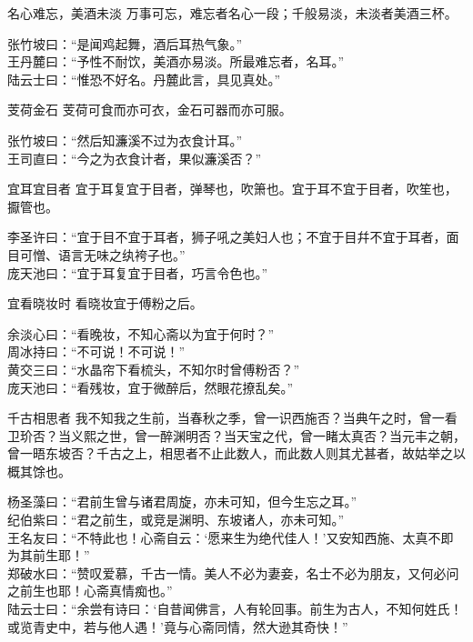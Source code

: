 \begin{yulu}{名心难忘，美酒未淡}
万事可忘，难忘者名心一段；千般易淡，未淡者美酒三杯。
\begin{comments}
张竹坡曰：“是闻鸡起舞，酒后耳热气象。” \\
王丹麓曰：“予性不耐饮，美酒亦易淡。所最难忘者，名耳。” \\
陆云士曰：“惟恐不好名。丹麓此言，具见真处。”
\end{comments}
\end{yulu}

\begin{yulu}{芰荷金石}
芰荷可食而亦可衣，金石可器而亦可服。
\begin{comments}
张竹坡曰：“然后知濂溪不过为衣食计耳。” \\
王司直曰：“今之为衣食计者，果似濂溪否？”
\end{comments}
\end{yulu}

\begin{yulu}{宜耳宜目者}
宜于耳复宜于目者，弹琴也，吹箫也。宜于耳不宜于目者，吹笙也，擫管也。
\begin{comments}
李圣许曰：“宜于目不宜于耳者，狮子吼之美妇人也；不宜于目幷不宜于耳者，面目可憎、语言无味之纨袴子也。” \\
庞天池曰：“宜于耳复宜于目者，巧言令色也。”
\end{comments}
\end{yulu}

\begin{yulu}{宜看晓妆时}
看晓妆宜于傅粉之后。
\begin{comments}
余淡心曰：“看晚妆，不知心斋以为宜于何时？” \\
周冰持曰：“不可说！不可说！” \\
黄交三曰：“水晶帘下看梳头，不知尔时曾傅粉否？” \\
庞天池曰：“看残妆，宜于微醉后，然眼花撩乱矣。”
\end{comments}
\end{yulu}

\begin{yulu}{千古相思者}
我不知我之生前，当春秋之季，曾一识西施否？当典午之时，曾一看卫玠否？当义熙之世，曾一醉渊明否？当天宝之代，曾一睹太真否？当元丰之朝，曾一晤东坡否？千古之上，相思者不止此数人，而此数人则其尤甚者，故姑举之以概其馀也。
\begin{comments}
杨圣藻曰：“君前生曾与诸君周旋，亦未可知，但今生忘之耳。” \\
纪伯紫曰：“君之前生，或竞是渊明、东坡诸人，亦未可知。” \\
王名友曰：“不特此也！心斋自云：‘愿来生为绝代佳人！’又安知西施、太真不即为其前生耶！” \\
郑破水曰：“赞叹爱慕，千古一情。美人不必为妻妾，名士不必为朋友，又何必问之前生也耶！心斋真情痴也。” \\
陆云士曰：“余尝有诗曰：‘自昔闻佛言，人有轮回事。前生为古人，不知何姓氏！或览青史中，若与他人遇！’竟与心斋同情，然大逊其奇快！”
\end{comments}
\end{yulu}

